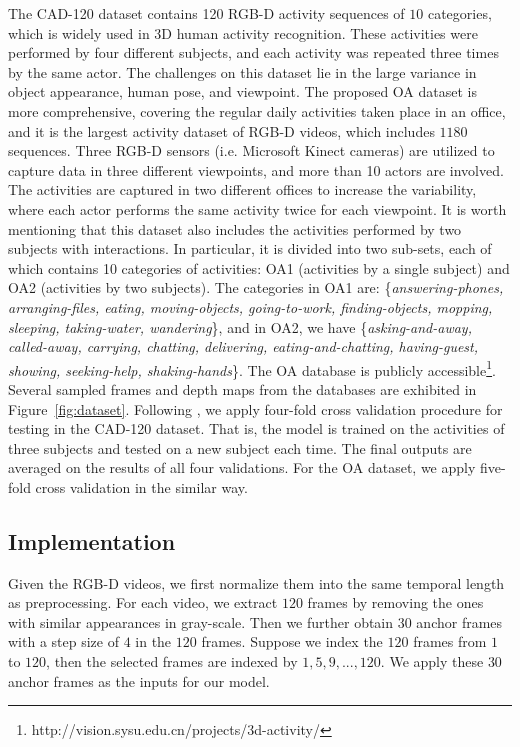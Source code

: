 \documentclass{sig-alternate}
\begin{document}
The CAD-120 dataset contains 120 RGB-D activity sequences of $10$ categories, which is widely used in 3D human activity recognition. These activities were performed by four different subjects, and each activity was repeated three times by the same actor. The challenges on this dataset lie in the large variance in object appearance, human pose, and viewpoint. The proposed OA dataset is more comprehensive, covering the regular daily activities taken place in an office, and it is the largest activity dataset of RGB-D videos, which includes $1180$ sequences. Three RGB-D sensors (i.e. Microsoft Kinect cameras) are utilized to capture data in three different viewpoints, and more than 10 actors are involved. The activities are captured in two different offices to increase the variability, where each actor performs the same activity twice for each viewpoint. It is worth mentioning that this dataset also includes the activities performed by two subjects with interactions. In particular,  it is divided into two sub-sets, each of which contains 10 categories of activities: OA1 (activities by a single subject) and OA2 (activities by two subjects). The categories in OA1 are: \{{\em answering-phones, arranging-files, eating, moving-objects, going-to-work, finding-objects, mopping, sleeping, taking-water, wandering}\}, and in OA2, we have \{{\em asking-and-away, called-away, carrying, chatting, delivering, eating-and-chatting, having-guest, showing, seeking-help, shaking-hands}\}. The OA database is publicly accessible\footnote{http://vision.sysu.edu.cn/projects/3d-activity/}. Several sampled frames and depth maps from the databases are exhibited in Figure~\ref{fig:dataset}. 
Following \cite{CADIJRR2013}, we apply four-fold cross validation procedure for testing in the CAD-120 dataset. That is, the model is trained on the activities of three subjects and tested on a new subject each time. The final outputs are averaged on the results of all four validations. For the OA dataset, we apply five-fold cross validation in the similar way.

\subsection{Implementation}

Given the RGB-D videos, we first normalize them into the same temporal length as preprocessing.  For each video, we extract $120$ frames by removing the ones with similar appearances in gray-scale. Then we further obtain $30$ anchor frames with a step size of $4$ in the $120$ frames. Suppose we index the $120$ frames from $1$ to $120$, then the selected frames are indexed by $1,5,9,...,120$. We apply these $30$ anchor frames as the inputs for our model.
\end{document}
